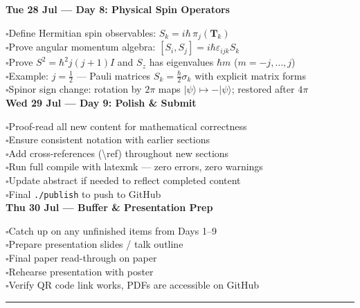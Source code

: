 \documentclass[11pt]{article}
\newcommand{\todo}{\textcolor{pending}{\Large $\square$}}
\newcommand{\secname}[1]{\vspace{1em}\noindent\textcolor{sectioncolor}{\Large\bfseries #1}}
\begin{document}
\secname{Tue 28 Jul --- Day 8: Physical Spin Operators}

\todo\quad Define Hermitian spin observables: $S_k=i\hbar\,\pi_j(\bm T_k)$\\
\todo\quad Prove angular momentum algebra: $[S_i,S_j]=i\hbar\varepsilon_{ijk}S_k$\\
\todo\quad Prove $S^2=\hbar^2j(j+1)I$ and $S_z$ has eigenvalues $\hbar m$ ($m=-j,\dots,j$)\\
\todo\quad Example: $j=\frac12$ --- Pauli matrices $S_k=\frac{\hbar}{2}\sigma_k$ with explicit matrix forms\\
\todo\quad Spinor sign change: rotation by $2\pi$ maps $|\psi\rangle\mapsto-|\psi\rangle$; restored after $4\pi$\\

\secname{Wed 29 Jul --- Day 9: Polish \& Submit}

\todo\quad Proof-read all new content for mathematical correctness\\
\todo\quad Ensure consistent notation with earlier sections\\
\todo\quad Add cross-references (\textbackslash ref) throughout new sections\\
\todo\quad Run full compile with latexmk --- zero errors, zero warnings\\
\todo\quad Update abstract if needed to reflect completed content\\
\todo\quad Final \texttt{./publish} to push to GitHub\\

\secname{Thu 30 Jul --- Buffer \& Presentation Prep}

\todo\quad Catch up on any unfinished items from Days 1--9\\
\todo\quad Prepare presentation slides / talk outline\\
\todo\quad Final paper read-through on paper\\
\todo\quad Rehearse presentation with poster\\
\todo\quad Verify QR code link works, PDFs are accessible on GitHub\\

\vspace{1em}
\hrule
\vspace{0.5em}
\end{document}
